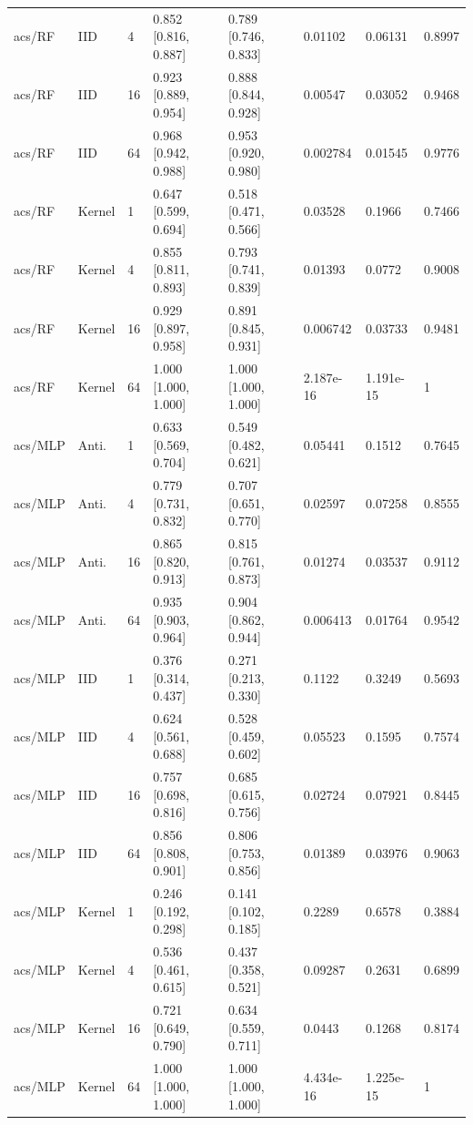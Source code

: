 \begin{tabular}{llllllll}
acs/RF & IID & 4 & 0.852 [0.816, 0.887] & 0.789 [0.746, 0.833] & 0.01102 & 0.06131 & 0.8997 \\
acs/RF & IID & 16 & 0.923 [0.889, 0.954] & 0.888 [0.844, 0.928] & 0.00547 & 0.03052 & 0.9468 \\
acs/RF & IID & 64 & 0.968 [0.942, 0.988] & 0.953 [0.920, 0.980] & 0.002784 & 0.01545 & 0.9776 \\
acs/RF & Kernel & 1 & 0.647 [0.599, 0.694] & 0.518 [0.471, 0.566] & 0.03528 & 0.1966 & 0.7466 \\
acs/RF & Kernel & 4 & 0.855 [0.811, 0.893] & 0.793 [0.741, 0.839] & 0.01393 & 0.0772 & 0.9008 \\
acs/RF & Kernel & 16 & 0.929 [0.897, 0.958] & 0.891 [0.845, 0.931] & 0.006742 & 0.03733 & 0.9481 \\
acs/RF & Kernel & 64 & 1.000 [1.000, 1.000] & 1.000 [1.000, 1.000] & 2.187e-16 & 1.191e-15 & 1 \\
acs/MLP & Anti. & 1 & 0.633 [0.569, 0.704] & 0.549 [0.482, 0.621] & 0.05441 & 0.1512 & 0.7645 \\
acs/MLP & Anti. & 4 & 0.779 [0.731, 0.832] & 0.707 [0.651, 0.770] & 0.02597 & 0.07258 & 0.8555 \\
acs/MLP & Anti. & 16 & 0.865 [0.820, 0.913] & 0.815 [0.761, 0.873] & 0.01274 & 0.03537 & 0.9112 \\
acs/MLP & Anti. & 64 & 0.935 [0.903, 0.964] & 0.904 [0.862, 0.944] & 0.006413 & 0.01764 & 0.9542 \\
acs/MLP & IID & 1 & 0.376 [0.314, 0.437] & 0.271 [0.213, 0.330] & 0.1122 & 0.3249 & 0.5693 \\
acs/MLP & IID & 4 & 0.624 [0.561, 0.688] & 0.528 [0.459, 0.602] & 0.05523 & 0.1595 & 0.7574 \\
acs/MLP & IID & 16 & 0.757 [0.698, 0.816] & 0.685 [0.615, 0.756] & 0.02724 & 0.07921 & 0.8445 \\
acs/MLP & IID & 64 & 0.856 [0.808, 0.901] & 0.806 [0.753, 0.856] & 0.01389 & 0.03976 & 0.9063 \\
acs/MLP & Kernel & 1 & 0.246 [0.192, 0.298] & 0.141 [0.102, 0.185] & 0.2289 & 0.6578 & 0.3884 \\
acs/MLP & Kernel & 4 & 0.536 [0.461, 0.615] & 0.437 [0.358, 0.521] & 0.09287 & 0.2631 & 0.6899 \\
acs/MLP & Kernel & 16 & 0.721 [0.649, 0.790] & 0.634 [0.559, 0.711] & 0.0443 & 0.1268 & 0.8174 \\
acs/MLP & Kernel & 64 & 1.000 [1.000, 1.000] & 1.000 [1.000, 1.000] & 4.434e-16 & 1.225e-15 & 1 \\
\bottomrule
\end{tabular}

\endgroup
